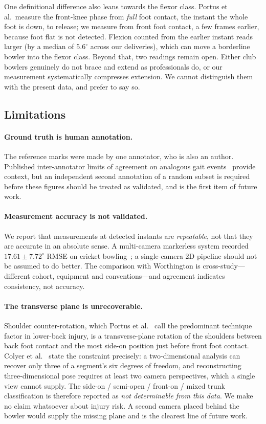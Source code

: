\documentclass[11pt,a4paper]{article}
\begin{document}
One definitional difference also leans towards the flexor class. Portus et
al.\ measure the front-knee phase from \emph{full} foot contact, the instant
the whole foot is down, to release; we measure from front foot contact, a few
frames earlier, because foot flat is not detected. Flexion counted from the
earlier instant reads larger (by a median of $5.6^\circ$ across our
deliveries), which can move a borderline bowler into the flexor class.
Beyond that, two readings remain open. Either club bowlers genuinely do not
brace and extend as professionals do, or our measurement systematically
compresses extension. We cannot distinguish them with the present data, and
prefer to say so.

\subsection{Limitations}
\label{sec:limits}

\paragraph{Ground truth is human annotation.} The reference marks were made by
one annotator, who is also an author. Published inter-annotator limits of
agreement on analogous gait events~\cite{gait2022} provide context, but an
independent second annotation of a random subset is required before these
figures should be treated as validated, and is the first item of future work.

\paragraph{Measurement accuracy is not validated.} We report that measurements
at detected instants are \emph{repeatable}, not that they are accurate in an
absolute sense. A multi-camera markerless system recorded $17.61 \pm
7.72^\circ$ RMSE on cricket bowling~\cite{abraham2025}; a single-camera 2D
pipeline should not be assumed to do better. The comparison with
Worthington is cross-study---different cohort, equipment and conventions---and
agreement indicates consistency, not accuracy.

\paragraph{The transverse plane is unrecoverable.} Shoulder counter-rotation,
which Portus et al.~\cite{portus2004} call the predominant technique factor in
lower-back injury, is a transverse-plane rotation of the shoulders between back
foot contact and the most side-on position just before front foot contact.
Colyer et al.~\cite{colyer2018} state the constraint precisely: a
two-dimensional analysis can recover only three of a segment's six degrees of
freedom, and reconstructing three-dimensional pose requires at least two camera
perspectives, which a single view cannot supply. The side-on / semi-open / front-on / mixed trunk
classification is therefore reported as \emph{not determinable from this data}.
We make no claim whatsoever about injury risk. A second camera placed behind
the bowler would supply the missing plane and is the clearest line of future
work.
\end{document}
